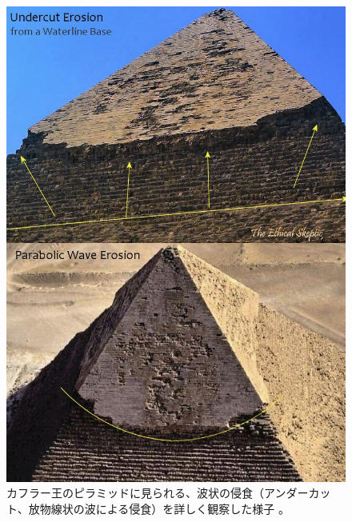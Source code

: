 \documentclass[10pt,twocolumn,letterpaper]{article}
\begin{document}
\begin{figure}[H]
\begin{center}
   \includegraphics[width=1\linewidth]{wave.jpg}
\end{center}
   \caption{カフラー王のピラミッドに見られる、波状の侵食（アンダーカット、放物線状の波による侵食）を詳しく観察した様子 \cite{27}。}
\label{fig:19}
\label{fig:onecol}
\end{figure}
\end{document}
